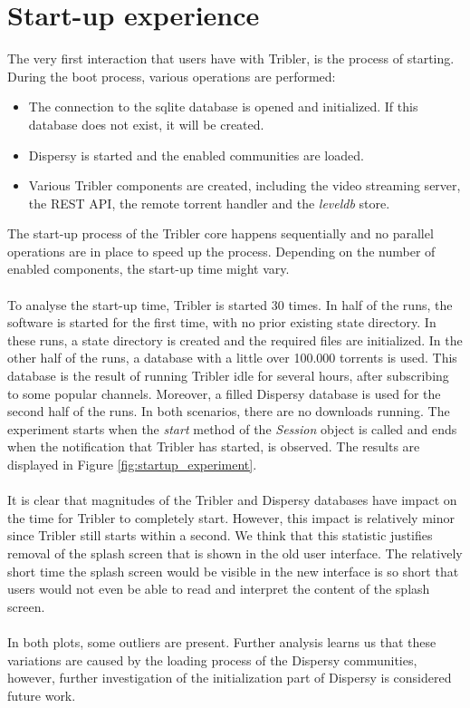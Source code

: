 \section{Start-up experience}
The very first interaction that users have with Tribler, is the process of starting. During the boot process, various operations are performed:
\begin{itemize}
	\item The connection to the sqlite database is opened and initialized. If this database does not exist, it will be created.
	\item Dispersy is started and the enabled communities are loaded.
	\item Various Tribler components are created, including the video streaming server, the REST API, the remote torrent handler and the \emph{leveldb} store.
\end{itemize}
The start-up process of the Tribler core happens sequentially and no parallel operations are in place to speed up the process. Depending on the number of enabled components, the start-up time might vary.\\\\
To analyse the start-up time, Tribler is started 30 times. In half of the runs, the software is started for the first time, with no prior existing state directory. In these runs, a state directory is created and the required files are initialized. In the other half of the runs, a database with a little over 100.000 torrents is used. This database is the result of running Tribler idle for several hours, after subscribing to some popular channels. Moreover, a filled Dispersy database is used for the second half of the runs. In both scenarios, there are no downloads running. The experiment starts when the \emph{start} method of the \emph{Session} object is called and ends when the notification that Tribler has started, is observed. The results are displayed in Figure \ref{fig:startup_experiment}.\\\\
It is clear that magnitudes of the Tribler and Dispersy databases have impact on the time for Tribler to completely start. However, this impact is relatively minor since Tribler still starts within a second. We think that this statistic justifies removal of the splash screen that is shown in the old user interface. The relatively short time the splash screen would be visible in the new interface is so short that users would not even be able to read and interpret the content of the splash screen.\\\\
In both plots, some outliers are present. Further analysis learns us that these variations are caused by the loading process of the Dispersy communities, however, further investigation of the initialization part of Dispersy is considered future work.

